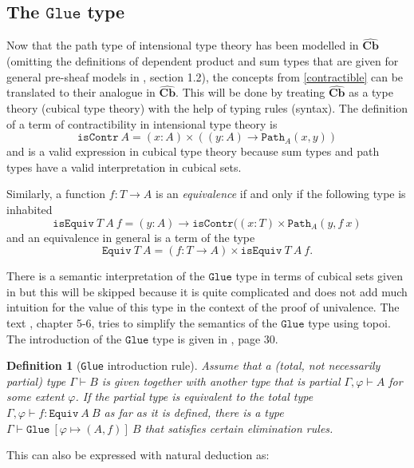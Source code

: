 \documentclass[12pt,a4paper,twoside,xetex]{book} %
\newcommand{\keyword}[1]{\emph{#1}\index{#1}}
\newtheorem{definition}[theorem]{Definition}
\newcommand{\psh}[1]{\widehat{#1}}
\newcommand{\op}[1]{\mathtt{#1}}
\newcommand{\cube}[0]{\textbf{Cb}}
\newcommand{\pa}[3]{\op{Path}_{#1}\left(#2, #3\right)}
\newcommand{\isequiv}[3]{\op{isEquiv} \ #1 \ #2 \ #3}
\begin{document}
\subsection{The $\op{Glue}$ type}\label{glueOp}



Now that the path type of intensional type theory has been modelled in $\psh{\cube}$ (omitting the definitions of dependent product and sum types that are given for general pre-sheaf models in \cite{Huber2016}, section 1.2), the concepts from \cref{contractible} can be translated to their analogue in $\psh{\cube}$. This will be done by treating $\psh{\cube}$ as a type theory (cubical type theory) with the help of typing rules (syntax). The 
definition of a term of contractibility in intensional type theory is 
$$\op{isContr} \ A = (x:A) \times \left( (y:A) \rightarrow \pa{A}{x}{y} 
\right)$$ and is a valid expression in cubical type theory because sum types 
and path types have a valid interpretation in cubical sets.

Similarly, a function $f:T \rightarrow A$ is an \keyword{equivalence} if and 
only if the following type is inhabited $$\isequiv{T}{A}{f} = (y: A) 
\rightarrow \op{isContr} ((x:T) \times \pa{A}{y}{f \ x}$$  and an equivalence 
in general is a term of the type $$\op{Equiv} \ T \ A = (f:T\rightarrow A) 
\times \isequiv{T}{A}{f}.$$ 
 

There is a semantic interpretation of the $\op{Glue}$ type in terms of cubical 
sets given in \cite{Huber2016} but this will be skipped because it is quite 
complicated and does not add much intuition for the value of this type in the 
context of the proof of univalence. The text \cite{Orton2019}, chapter 5-6, 
tries to simplify the semantics of the $\op{Glue}$ type using topoi. The 
introduction of the $\op{Glue}$ type is given in \cite{Orton2019}, page 30.

\begin{definition}[\texttt{Glue} introduction rule]
Assume that a (total, not 
necessarily partial) type $\Gamma \vdash B$ is given together with another type that is partial 
$\Gamma, \varphi \vdash A$ for some extent $\varphi$. If the partial type is 
equivalent to the total type $\Gamma, \varphi \vdash f : \op{Equiv} \ A \ B $ 
as far as it is defined, there is a type $\Gamma \vdash \op{Glue} \ \left[ 
\varphi \mapsto \left( A, f \right) \right] \ B$ that satisfies certain 
elimination rules. 
\end{definition}


 This can also be expressed with natural deduction as:
\end{document}
